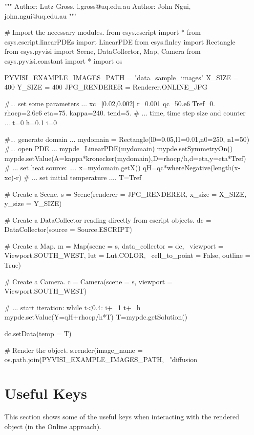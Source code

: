 \begin{python}
"""
Author: Lutz Gross, l.gross@uq.edu.au
Author: John Ngui, john.ngui@uq.edu.au
"""

# Import the necessary modules.
from esys.escript import *
from esys.escript.linearPDEs import LinearPDE
from esys.finley import Rectangle
from esys.pyvisi import Scene, DataCollector, Map, Camera
from esys.pyvisi.constant import *
import os

PYVISI_EXAMPLE_IMAGES_PATH = "data_sample_images"
X_SIZE = 400
Y_SIZE = 400
JPG_RENDERER = Renderer.ONLINE_JPG

#... set some parameters ...
xc=[0.02,0.002]
r=0.001
qc=50.e6
Tref=0.
rhocp=2.6e6
eta=75.
kappa=240.
tend=5.
# ... time, time step size and counter ...
t=0
h=0.1
i=0

#... generate domain ...
mydomain = Rectangle(l0=0.05,l1=0.01,n0=250, n1=50)
#... open PDE ...
mypde=LinearPDE(mydomain)
mypde.setSymmetryOn()
mypde.setValue(A=kappa*kronecker(mydomain),D=rhocp/h,d=eta,y=eta*Tref)
# ... set heat source: ....
x=mydomain.getX()
qH=qc*whereNegative(length(x-xc)-r)
# ... set initial temperature ....
T=Tref

# Create a Scene.
s = Scene(renderer = JPG_RENDERER, x_size = X_SIZE, y_size = Y_SIZE)

# Create a DataCollector reading directly from escript objects.
dc = DataCollector(source = Source.ESCRIPT)

# Create a Map.
m = Map(scene = s, data_collector = dc, \
        viewport = Viewport.SOUTH_WEST, lut = Lut.COLOR, \
        cell_to_point = False, outline = True)

# Create a Camera.
c = Camera(scene = s, viewport = Viewport.SOUTH_WEST)

# ... start iteration:
while t<0.4:
      i+=1
      t+=h
      mypde.setValue(Y=qH+rhocp/h*T)
      T=mypde.getSolution()

      dc.setData(temp = T)
      
      # Render the object.
      s.render(image_name = os.path.join(PYVISI_EXAMPLE_IMAGES_PATH, \
              "diffusion%
\end{python}

\newpage

\section{Useful Keys}
This section shows some of the useful keys when interacting with the rendered
object (in the Online approach).

